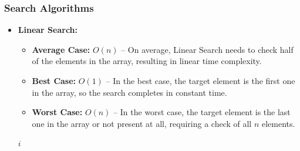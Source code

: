 \documentclass[12pt]{book} %
\begin{document}
\subsubsection{Search Algorithms}
\begin{itemize}
    \item \textbf{Linear Search:}
        \begin{itemize}
            \item \textbf{Average Case:} $O(n)$ – On average, Linear Search needs to check half of the elements in the array, resulting in linear time complexity.
            \item \textbf{Best Case:} $O(1)$ – In the best case, the target element is the first one in the array, so the search completes in constant time.
            \item \textbf{Worst Case:} $O(n)$ – In the worst case, the target element is the last one in the array or not present at all, requiring a check of all $n$ elements.
        \end{itemize}
        \begin{algorithm}
            \caption{Linear Search}
            \begin{algorithmic}[1]
                            \State \Return $i$
                        \EndIf
                    \EndFor
                    \State {}
                    \EndProcedure
                \end{algorithmic}
            \end{algorithm}


\end{itemize}
\end{document}
